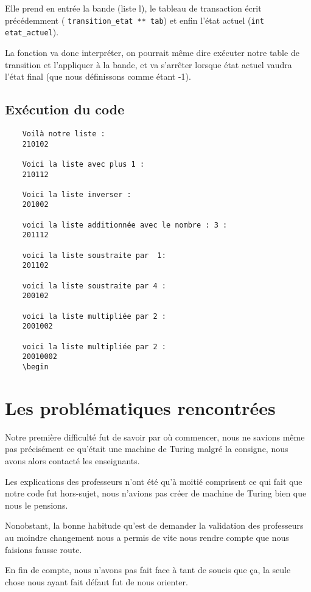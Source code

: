 \documentclass[a4paper,10pt, parskip=true]{scrartcl}
\begin{document}
        Elle prend en entrée la bande (liste l), le tableau de transaction écrit précédemment ( \texttt{transition_etat ** tab}) et enfin l'état actuel (\texttt{int etat_actuel}).
        
        La fonction va donc interpréter, on pourrait même dire exécuter notre table de transition et l'appliquer à la bande, et va s'arrêter lorsque état actuel vaudra l'état final (que nous définissons comme étant -1).
        
    \subsection{Exécution du code}
    \begin{verbatim}
    Voilà notre liste : 
    210102
    
    Voici la liste avec plus 1 : 
    210112
    
    Voici la liste inverser : 
    201002
    
    voici la liste additionnée avec le nombre : 3 : 
    201112
    
    voici la liste soustraite par  1: 
    201102
    
    voici la liste soustraite par 4 : 
    200102
    
    voici la liste multipliée par 2 : 
    2001002
    
    voici la liste multipliée par 2 : 
    20010002
    \begin 
    \end{verbatim}

\section{Les problématiques rencontrées}
    Notre première difficulté fut de savoir par où commencer, nous ne savions même pas précisément ce qu'était une machine de Turing malgré la consigne, nous avons alors contacté les enseignants.
    
    Les explications des professeurs n'ont été qu'à moitié comprisent ce qui fait que notre code fut hors-sujet, nous n'avions pas créer de machine de Turing bien que nous le pensions.
    
    Nonobstant, la bonne habitude qu'est de demander la validation des professeurs au moindre changement nous a permis de vite nous rendre compte que nous faisions fausse route.
    
    En fin de compte, nous n'avons pas fait face à tant de soucis que ça, la seule chose nous ayant fait défaut fut de nous orienter.
    
\end{document}

